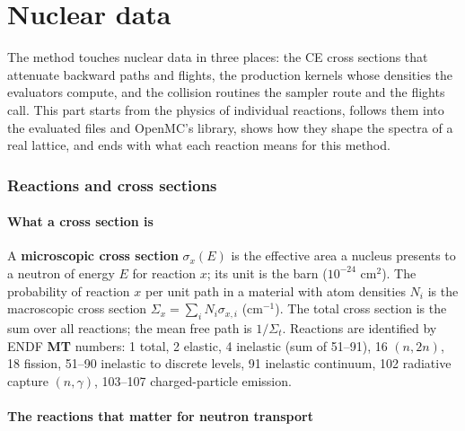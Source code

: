 \part{Nuclear data}\label{part:nd}

The method touches nuclear data in three places: the CE cross sections that attenuate backward
paths and flights, the production kernels whose densities the evaluators compute, and the collision
routines the sampler route and the flights call. This part starts from the physics of individual
reactions, follows them into the evaluated files and OpenMC's library, shows how they shape the
spectra of a real lattice, and ends with what each reaction means for this method.

\section{Reactions and cross sections}\label{sec:nd:reactions}

\subsection{What a cross section is}

A \textbf{microscopic cross section} $\sigma_x(E)$ is the effective area a nucleus presents to a
neutron of energy $E$ for reaction $x$; its unit is the barn ($10^{-24}$ cm$^2$). The probability of
reaction $x$ per unit path in a material with atom densities $N_i$ is the macroscopic cross section
$\Sigma_x=\sum_iN_i\sigma_{x,i}$ (cm$^{-1}$). The total cross section is the sum over all reactions;
the mean free path is $1/\Sigma_t$. Reactions are identified by ENDF \textbf{MT} numbers: 1 total, 2
elastic, 4 inelastic (sum of 51--91), 16 $(n,2n)$, 18 fission, 51--90 inelastic to discrete levels,
91 inelastic continuum, 102 radiative capture $(n,\gamma)$, 103--107 charged-particle emission.

\subsection{The reactions that matter for neutron transport}

